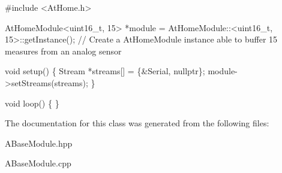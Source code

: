 \begin{DoxyCode}
\textcolor{preprocessor}{#include <AtHome.h>}

AtHomeModule<uint16\_t, 15> *module = AtHomeModule::<uint16\_t, 15>::getInstance(); \textcolor{comment}{// Create a AtHomeModule
       instance able to buffer 15 measures from an analog sensor}

\textcolor{keywordtype}{void} setup() \{
  Stream *streams[] = \{&Serial, \textcolor{keyword}{nullptr}\};
  module->setStreams(streams);
\}

\textcolor{keywordtype}{void} loop() \{
\}
\end{DoxyCode}
 

The documentation for this class was generated from the following files\+:\begin{DoxyCompactItemize}
\item 
A\+Base\+Module.\+hpp\item 
A\+Base\+Module.\+cpp\end{DoxyCompactItemize}
